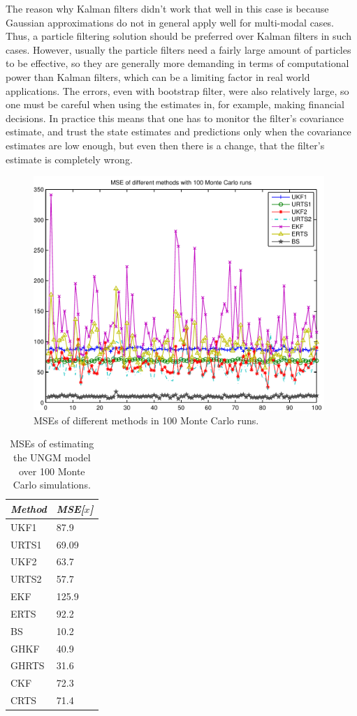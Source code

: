 The reason why Kalman filters didn't work that well in this case is
because Gaussian approximations do not in general apply well for
multi-modal cases. Thus, a particle filtering solution should be
preferred over Kalman filters in such cases. However, usually the
particle filters need a fairly large amount of particles to be
effective, so they are generally more demanding in terms of
computational power than Kalman filters, which can be a limiting
factor in real world applications. The errors, even with bootstrap
filter, were also relatively large, so one must be careful when using
the estimates in, for example, making financial decisions. In practice
this means that one has to monitor the filter's covariance estimate,
and trust the state estimates and predictions only when the covariance
estimates are low enough, but even then there is a change, that the
filter's estimate is completely wrong.


\begin{figure}
\begin{center}
\includegraphics[width=11cm]{pics/ungm_mse}
\caption{MSEs of different methods in 100 Monte Carlo runs.}
\label{fig:ungm_mse}
\end{center}
\end{figure}

\begin{table}
\begin{center}
\begin{tabular}{|l|l|} \hline {\it Method}&{\it MSE[$x$]}\\ \hline
UKF1 & 87.9 \\ URTS1& 69.09 \\ UKF2 & 63.7 \\ URTS2 & 57.7 \\ EKF &
125.9 \\ ERTS & 92.2 \\ BS & 10.2 \\
GHKF & 40.9 \\
GHRTS & 31.6 \\
CKF & 72.3 \\
CRTS & 71.4 \\
 \hline
\end{tabular}
\caption{MSEs of estimating the UNGM model over 100 Monte Carlo
simulations.}
\label{table:ungm_errors}
\end{center}
\end{table}
 



